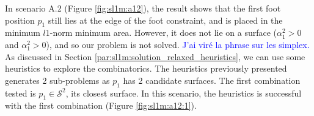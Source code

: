 In scenario A.2 (Figure \ref{fig:sl1m:a12}), the result shows that the first foot position $p_1$ still lies at the edge of the foot constraint, and is placed in the minimum $l1$-norm minimum area. However, it does not lie on a surface ($\alpha_1^2 > 0$ and $\alpha_1^2 > 0$), and so our problem is not solved.
  \textcolor{blue}{J'ai viré la phrase sur les simplex.}
As discussed in Section \ref{par:sl1m:solution_relaxed_heuristics}, we can use some heuristics to explore the combinatorics. 
The heuristics previously presented generates 2 sub-problems as $p_1$ has 2 candidate surfaces.
The first combination tested is $p_1 \in \mathcal{S}^2$, its closest surface.
In this scenario, the heuristics is successful with the first combination (Figure \ref{fig:sl1m:a12:1}).

